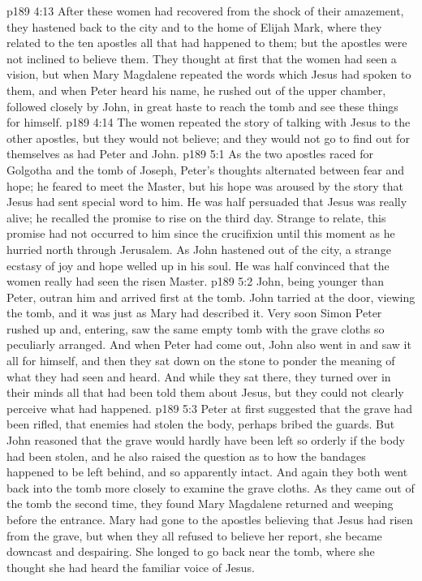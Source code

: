 \vs p189 4:13 After these women had recovered from the shock of their amazement, they hastened back to the city and to the home of Elijah Mark, where they related to the ten apostles all that had happened to them; but the apostles were not inclined to believe them. They thought at first that the women had seen a vision, but when Mary Magdalene repeated the words which Jesus had spoken to them, and when Peter heard his name, he rushed out of the upper chamber, followed closely by John, in great haste to reach the tomb and see these things for himself.
\vs p189 4:14 The women repeated the story of talking with Jesus to the other apostles, but they would not believe; and they would not go to find out for themselves as had Peter and John.
\vs p189 5:1 As the two apostles raced for Golgotha and the tomb of Joseph, Peter’s thoughts alternated between fear and hope; he feared to meet the Master, but his hope was aroused by the story that Jesus had sent special word to him. He was half persuaded that Jesus was really alive; he recalled the promise to rise on the third day. Strange to relate, this promise had not occurred to him since the crucifixion until this moment as he hurried north through Jerusalem. As John hastened out of the city, a strange ecstasy of joy and hope welled up in his soul. He was half convinced that the women really had seen the risen Master.
\vs p189 5:2 John, being younger than Peter, outran him and arrived first at the tomb. John tarried at the door, viewing the tomb, and it was just as Mary had described it. Very soon Simon Peter rushed up and, entering, saw the same empty tomb with the grave cloths so peculiarly arranged. And when Peter had come out, John also went in and saw it all for himself, and then they sat down on the stone to ponder the meaning of what they had seen and heard. And while they sat there, they turned over in their minds all that had been told them about Jesus, but they could not clearly perceive what had happened.
\vs p189 5:3 Peter at first suggested that the grave had been rifled, that enemies had stolen the body, perhaps bribed the guards. But John reasoned that the grave would hardly have been left so orderly if the body had been stolen, and he also raised the question as to how the bandages happened to be left behind, and so apparently intact. And again they both went back into the tomb more closely to examine the grave cloths. As they came out of the tomb the second time, they found Mary Magdalene returned and weeping before the entrance. Mary had gone to the apostles believing that Jesus had risen from the grave, but when they all refused to believe her report, she became downcast and despairing. She longed to go back near the tomb, where she thought she had heard the familiar voice of Jesus.
